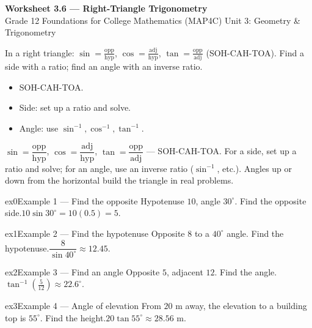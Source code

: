 \documentclass[11pt]{article}
\begin{document}
\begin{center}
{\LARGE\bfseries\color{titleblue}Worksheet 3.6 --- Right-Triangle Trigonometry}\\[2pt]
{\small Grade 12 Foundations for College Mathematics (MAP4C) \textperiodcentered{} Unit 3: Geometry \& Trigonometry}
\end{center}

\begin{ideabox}
In a right triangle: $\sin=\tfrac{\text{opp}}{\text{hyp}}$, $\cos=\tfrac{\text{adj}}{\text{hyp}}$, $\tan=\tfrac{\text{opp}}{\text{adj}}$ (SOH-CAH-TOA). Find a side with a ratio; find an angle with an inverse ratio.
\begin{itemize}[leftmargin=*,itemsep=2pt]
  \item SOH-CAH-TOA.
  \item Side: set up a ratio and solve.
  \item Angle: use $\sin^{-1},\cos^{-1},\tan^{-1}$.
\end{itemize}
\end{ideabox}

\begin{learnbox}
$\sin=\dfrac{\text{opp}}{\text{hyp}}$, $\cos=\dfrac{\text{adj}}{\text{hyp}}$, $\tan=\dfrac{\text{opp}}{\text{adj}}$ — SOH-CAH-TOA.
For a side, set up a ratio and solve; for an angle, use an inverse ratio ($\sin^{-1}$, etc.).
Angles up or down from the horizontal build the triangle in real problems.
\end{learnbox}


\begin{example}{ex0}{Example 1 --- Find the opposite}
Hypotenuse $10$, angle $30^\circ$. Find the opposite side.\soln $10\sin30^\circ=10(0.5)=5$.
\end{example}

\begin{example}{ex1}{Example 2 --- Find the hypotenuse}
Opposite $8$ to a $40^\circ$ angle. Find the hypotenuse.\soln $\dfrac{8}{\sin40^\circ}\approx12.45$.
\end{example}

\begin{example}{ex2}{Example 3 --- Find an angle}
Opposite $5$, adjacent $12$. Find the angle.\soln $\tan^{-1}\!\left(\tfrac{5}{12}\right)\approx22.6^\circ$.
\end{example}

\begin{example}{ex3}{Example 4 --- Angle of elevation}
From $20$ m away, the elevation to a building top is $55^\circ$. Find the height.\soln $20\tan55^\circ\approx28.56$ m.
\end{example}
\end{document}
